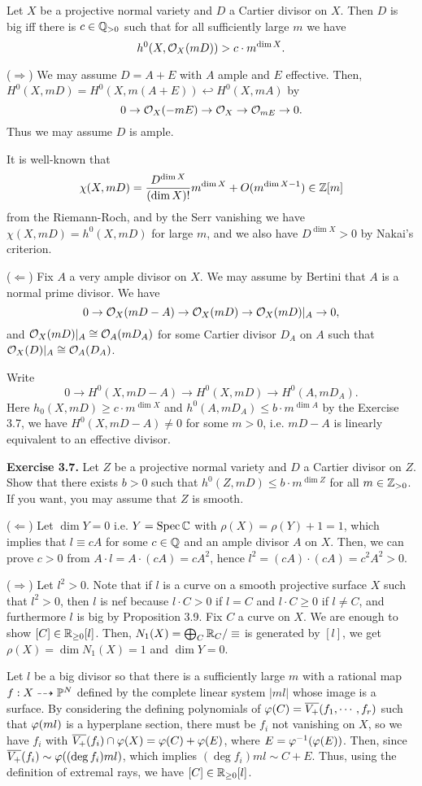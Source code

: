 \documentclass{../../small}
\begin{document}
\begin{prop}
Let $X$ be a projective normal variety and $D$ a Cartier divisor on $X$.
Then $D$ is big iff there is $c\in\Q_{>0}$ such that for all sufficiently large $m$ we have
\[h^0(X,\cO_X(mD))>c\cdot m^{\dim X}.\]
\end{prop}
\begin{pf}
($\Rightarrow$)
We may assume $D=A+E$ with $A$ ample and $E$ effective.
Then, $H^0(X,mD)=H^0(X,m(A+E))\hookleftarrow H^0(X,mA)$ by
\[0\to \cO_X(-mE)\to\cO_X\to\cO_{mE}\to0.\]
Thus we may assume $D$ is ample.

It is well-known that
\[\chi(X,mD)=\frac{D^{\dim X}}{(\dim X)!}m^{\dim X}+O(m^{\dim X-1})\in\Z[m]\]
from the Riemann-Roch, and by the Serr vanishing we have $\chi(X,mD)=h^0(X,mD)$ for large $m$, and we also have $D^{\dim X}>0$ by Nakai's criterion.

($\Leftarrow$)
Fix $A$ a very ample divisor on $X$.
We may assume by Bertini that $A$ is a normal prime divisor.
We have
\[0\to\cO_X(mD-A)\to\cO_X(mD)\to\cO_X(mD)|_A\to0,\]
and $\cO_X(mD)|_A\cong\cO_A(mD_A)$ for some Cartier divisor $D_A$ on $A$ such that $\cO_X(D)|_A\cong \cO_A(D_A)$.

Write
\[0\to H^0(X,mD-A)\to H^0(X,mD)\to H^0(A,mD_A).\]
Here $h_0(X,mD)\ge c\cdot m^{\dim X}$ and $h^0(A,mD_A)\le b\cdot m^{\dim A}$ by the Exercise 3.7, we have $H^0(X,mD-A)\ne0$ for some $m>0$, i.e. $mD-A$ is linearly equivalent to an effective divisor.
\end{pf}

\textbf{Exercise 3.7.} Let $Z$ be a projective normal variety and $D$ a Cartier divisor on $Z$.
Show that there exists $b>0$ such that $h^0(Z,mD)\le b\cdot m^{\dim Z}$ for all $m\in\Z_{>0}$.
If you want, you may assume that $Z$ is smooth.

\begin{pf}
($\Leftarrow$)
Let $\dim Y=0$ i.e. $Y=\Spec\C$ with $\rho(X)=\rho(Y)+1=1$, which implies that $l\equiv cA$ for some $c\in\Q$ and an ample divisor $A$ on $X$.
Then, we can prove $c>0$ from $A\cdot l=A\cdot(cA)=cA^2$, hence $l^2=(cA)\cdot(cA)=c^2A^2>0$.

($\Rightarrow$)
Let $l^2>0$.
Note that if $l$ is a curve on a smooth projective surface $X$ such that $l^2>0$, then $l$ is nef because $l\cdot C>0$ if $l=C$ and $l\cdot C\ge0$ if $l\ne C$, and furthermore $l$ is big by Proposition 3.9.
Fix $C$ a curve on $X$.
We are enough to show $[C]\in\R_{\ge0}[l]$.
Then, $N_1(X)=\bigoplus_C\R_C/\equiv$ is generated by $[l]$, we get $\rho(X)=\dim N_1(X)=1$ and $\dim Y=0$.

Let $l$ be a big divisor so that there is a sufficiently large $m$ with a rational map $f:X\dashrightarrow\P^N$ defined by the complete linear system $|ml|$ whose image is a surface.
By considering the defining polynomials of $\f(C)=\bar{V_+}(f_1,\cdots,f_r)$ such that $\f(ml)$ is a hyperplane section, there must be $f_i$ not vanishing on $X$, so we have $f_i$ with $\bar{V_+}(f_i)\cap\f(X)=\f(C)+\f(E)$, where $E=\f^{-1}(\f(E))$.
Then, since $\bar{V_+}(f_i)\sim\f((\deg f_i)ml)$, which implies $(\deg f_i)ml\sim C+E$.
Thus, using the definition of extremal rays, we have $[C]\in\R_{\ge0}[l]$.
\end{pf}
\end{document}
